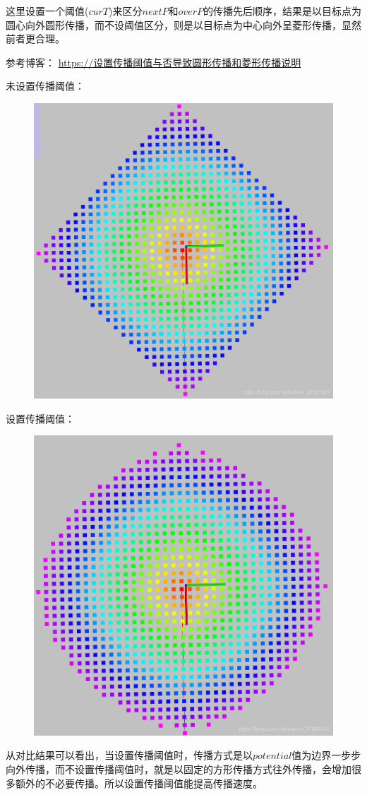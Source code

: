 \documentclass[9pt, oneside]{book}
\begin{document}
这里设置一个阈值($curT$)来区分$nextP$和$overP$的传播先后顺序，结果是以目标点为圆心向外圆形传播，而不设阈值区分，则是以目标点为中心向外呈菱形传播，显然前者更合理。

参考博客：
\href{https://blog.csdn.net/weixin_37835423/article/details/102996256?spm=1001.2101.3001.6650.5&utm_medium=distribute.pc_relevant.none-task-blog-2%7Edefault%7EBlogCommendFromBaidu%7Edefault-5.no_search_link&depth_1-utm_source=distribute.pc_relevant.none-task-blog-2%7Edefault%7EBlogCommendFromBaidu%7Edefault-5.no_search_link}{https://设置传播阈值与否导致圆形传播和菱形传播说明}

未设置传播阈值：

\begin{figure}[H]
    \centering
    \includegraphics[width=0.5\linewidth]{image/curT_off.png}
\end{figure}

设置传播阈值：

\begin{figure}[H]
    \centering
    \includegraphics[width=0.5\linewidth]{image/curT_on.png}
\end{figure}

从对比结果可以看出，当设置传播阈值时，传播方式是以$potential$值为边界一步步向外传播，而不设置传播阈值时，就是以固定的方形传播方式往外传播，会增加很多额外的不必要传播。所以设置传播阈值能提高传播速度。
\end{document}
